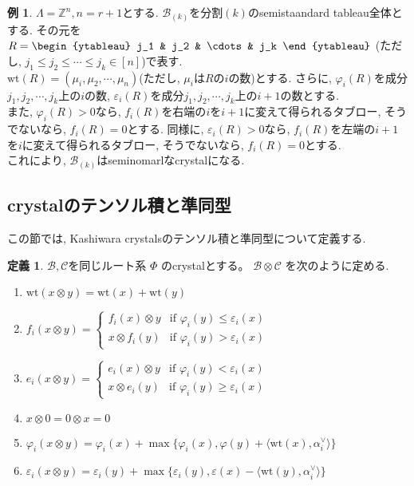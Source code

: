 \documentclass[a4,12pt, titlepage]{jarticle}
\theoremstyle{definition}
\newtheorem{df}{定義}
\newtheorem*{ex}{例}
\begin{document}
\begin{ex}
  $\Lambda = \mathbb{Z}^n, n = r+1$とする.
  $\mathscr{B}_{(k)}$を分割$(k)$のsemistaandard tableau全体とする. その元を$ R = \begin{ytableau} j_1 & j_2 & \cdots & j_k  \end{ytableau}$
  (ただし, $j_1 \leq j_2 \leq \cdots \leq j_k \in [n]$)で表す. \\
  $\mathrm{wt}(R) = (\mu_i, \mu_2, \cdots, \mu_n)$(ただし, $\mu_i$は$R$の$i$の数)とする. 
  さらに, $\varphi_i(R)$を成分$j_1, j_2, \cdots, j_k$上の$i$の数, $\varepsilon_i(R)$を成分$j_1, j_2, \cdots, j_k$上の$i+1$の数とする. \\
  また, $\varphi_i(R) > 0$なら, $f_i(R)$を右端の$i$を$i+1$に変えて得られるタブロー, そうでないなら, $f_i(R) = 0$とする.
  同様に, $\varepsilon_i(R) > 0$なら, $f_i(R)$を左端の$i+1$を$i$に変えて得られるタブロー, そうでないなら, $f_i(R) = 0$とする.\\
  これにより, $\mathscr{B}_{(k)}$はseminomarlなcrystalになる.
\end{ex}

%
\subsection{crystalのテンソル積と準同型}
この節では, Kashiwara crystalsのテンソル積と準同型について定義する. 
\bigskip

\begin{df}
  $\mathscr{B}, \mathscr{C}$を同じルート系 $\Phi$ のcrystalとする。
  $\mathscr{B} \otimes \mathscr{C}$ を次のように定める.
  \begin{enumerate}
    \item $\mathrm{wt}(x \otimes y) = \mathrm{wt}(x) + \mathrm{wt}(y)$
    \item $f_i(x \otimes y) = 
    \begin{cases} 
      f_i(x) \otimes y & \text{if } \varphi_i(y) \leq \varepsilon_i(x) \\
      x \otimes f_i(y) & \text{if } \varphi_i(y) > \varepsilon_i(x)
    \end{cases}$
    \item $e_i(x \otimes y) = 
    \begin{cases} 
      e_i(x) \otimes y & \text{if } \varphi_i(y) < \varepsilon_i(x) \\
      x \otimes e_i(y) & \text{if } \varphi_i(y) \geq \varepsilon_i(x)
    \end{cases}$
    \item $x \otimes 0 = 0 \otimes x = 0$
    \item $\varphi_i(x \otimes y) = \varphi_i(x) + \max\{ \varphi_i(x), \varphi(y) + \langle \mathrm{wt}(x), \alpha_i^{ \vee } \rangle \} $
    \item $\varepsilon_i(x \otimes y) = \varepsilon_i(y) + \max\{ \varepsilon_i(y), \varepsilon(x) - \langle \mathrm{wt}(y), \alpha_i^{ \vee } \rangle \} $
  \end{enumerate}
\end{df}
\end{document}
